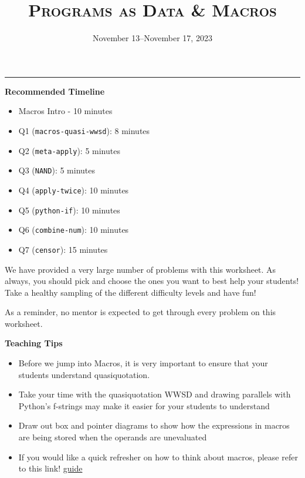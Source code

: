 \documentclass{exam}
\title{\textsc{Programs as Data \& Macros}}
\date{November 13--November 17, 2023}
\begin{document}
\maketitle
\rule{\textwidth}{0.15em}

\begin{meta}
\begin{blocksection}
    \textbf{Recommended Timeline}
    \begin{itemize}
        \item Macros Intro - 10 minutes
        \item Q1 (\lstinline{macros-quasi-wwsd}): 8 minutes
        \item Q2 (\lstinline{meta-apply}): 5 minutes
        \item Q3 (\lstinline{NAND}): 5 minutes
        \item Q4 (\lstinline{apply-twice}): 10 minutes
        \item Q5 (\lstinline{python-if}): 10 minutes
        \item Q6 (\lstinline{combine-num}): 10 minutes
        \item Q7 (\lstinline{censor}): 15 minutes 
    \end{itemize}
\end{blocksection}
\end{meta}
We have provided a very large number of problems with this worksheet. As always, you should pick and choose the ones you want to best help your students! Take a healthy sampling of the different difficulty levels and have fun!

As a reminder, no mentor is expected to get through every problem on this worksheet. 
\begin{meta}
\textbf{Teaching Tips}
\begin{itemize}
    \item Before we jump into Macros, it is very important to ensure that your students understand quasiquotation.
    \item Take your time with the quasiquotation WWSD and drawing parallels with Python's f-strings may make it easier for your students to understand 
    \item Draw out box and pointer diagrams to show how the expressions in macros are being stored when the operands are unevaluated
    \item If you would like a quick refresher on how to think about macros, please refer to this link! \href{https://docs.google.com/document/d/1JSbvtJ5bYUEhovDZd_gQnBvkG_WDcafmX-4B3QeIXZU/edit}{guide}
\end{itemize}
\end{meta}
\end{document}
